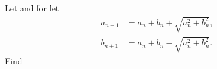 Let  and for  let
\begin{align*}a_{n+1}&=a_n+b_n+\sqrt{a_n^2+b_n^2},\\b_{n+1}&=a_n+b_n-\sqrt{a_n^2+b_n^2}.\end{align*} Find 